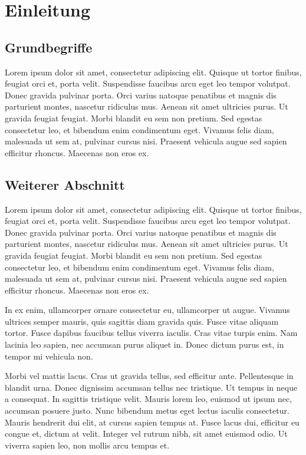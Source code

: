 \chapter{Einleitung}

\section{Grundbegriffe}

Lorem ipsum dolor sit amet, consectetur adipiscing elit. Quisque ut tortor finibus, feugiat orci et, porta velit. Suspendisse faucibus arcu eget leo tempor volutpat. Donec gravida pulvinar porta. Orci varius natoque penatibus et magnis dis parturient montes, nascetur ridiculus mus. Aenean sit amet ultricies purus. Ut gravida feugiat feugiat. Morbi blandit eu sem non pretium. Sed egestas consectetur leo, et bibendum enim condimentum eget. Vivamus felis diam, malesuada ut sem at, pulvinar cursus nisi. Praesent vehicula augue sed sapien efficitur rhoncus. Maecenas non eros ex. 

\section{Weiterer Abschnitt}

Lorem ipsum dolor sit amet, consectetur adipiscing elit. Quisque ut tortor finibus, feugiat orci et, porta velit. Suspendisse faucibus arcu eget leo tempor volutpat. Donec gravida pulvinar porta. Orci varius natoque penatibus et magnis dis parturient montes, nascetur ridiculus mus. Aenean sit amet ultricies purus. Ut gravida feugiat feugiat. Morbi blandit eu sem non pretium. Sed egestas consectetur leo, et bibendum enim condimentum eget. Vivamus felis diam, malesuada ut sem at, pulvinar cursus nisi. Praesent vehicula augue sed sapien efficitur rhoncus. Maecenas non eros ex.

In ex enim, ullamcorper ornare consectetur eu, ullamcorper ut augue. Vivamus ultrices semper mauris, quis sagittis diam gravida quis. Fusce vitae aliquam tortor. Fusce dapibus faucibus tellus viverra iaculis. Cras vitae turpis enim. Nam lacinia leo sapien, nec accumsan purus aliquet in. Donec dictum purus est, in tempor mi vehicula non.

Morbi vel mattis lacus. Cras ut gravida tellus, sed efficitur ante. Pellentesque in blandit urna. Donec dignissim accumsan tellus nec tristique. Ut tempus in neque a consequat. In sagittis tristique velit. Mauris lorem leo, euismod ut ipsum nec, accumsan posuere justo. Nunc bibendum metus eget lectus iaculis consectetur. Mauris hendrerit dui elit, at cursus sapien tempus at. Fusce lacus dui, efficitur eu congue et, dictum at velit. Integer vel rutrum nibh, sit amet euismod odio. Ut viverra sapien leo, non mollis arcu tempus et.
